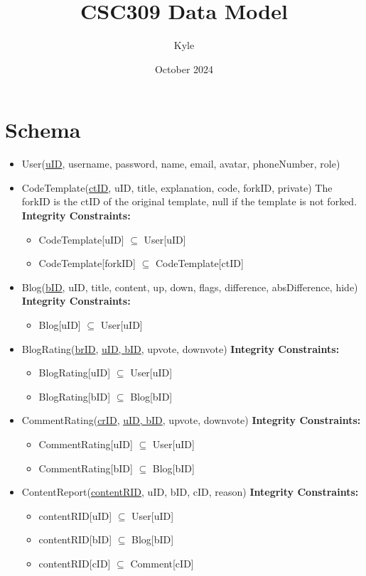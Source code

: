 \documentclass{article}
\title{CSC309 Data Model}
\author{Kyle}
\date{October 2024}
\begin{document}
\maketitle

\section*{Schema}

\begin{itemize}
\item
User(\underline{uID}, username, password, name, email, avatar, phoneNumber, role)

\item
CodeTemplate(\underline{ctID}, uID, title, explanation, code, forkID, private)
The forkID is the ctID of the original template, null if the template is not forked.
\textbf{Integrity Constraints:}
\begin{itemize}
\item CodeTemplate[uID] $\subseteq$ User[uID]
\item CodeTemplate[forkID] $\subseteq$ CodeTemplate[ctID]
\end{itemize}

\item
Blog(\underline{bID}, uID, title, content, up, down, flags, difference, absDifference, hide)
\textbf{Integrity Constraints:}
\begin{itemize}
\item Blog[uID] $\subseteq$ User[uID]
\end{itemize}

\item
BlogRating(\underline{brID}, \underline{uID, bID}, upvote, downvote)
\textbf{Integrity Constraints:}
\begin{itemize}
\item BlogRating[uID] $\subseteq$ User[uID]
\item BlogRating[bID] $\subseteq$ Blog[bID]
\end{itemize}

\item
CommentRating(\underline{crID}, \underline{uID, bID}, upvote, downvote)
\textbf{Integrity Constraints:}
\begin{itemize}
\item CommentRating[uID] $\subseteq$ User[uID]
\item CommentRating[bID] $\subseteq$ Blog[bID]
\end{itemize}

\item
ContentReport(\underline{contentRID}, uID, bID, cID, reason)
\textbf{Integrity Constraints:}
\begin{itemize}
\item contentRID[uID] $\subseteq$ User[uID]
\item contentRID[bID] $\subseteq$ Blog[bID]
\item contentRID[cID] $\subseteq$ Comment[cID]
\end{itemize}


\end{itemize}
\end{document}
